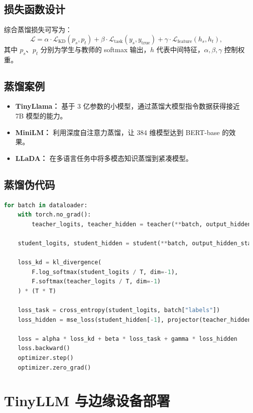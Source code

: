 \documentclass[UTF8,zihao=-4]{ctexart}
\begin{document}
\subsection{损失函数设计}
综合蒸馏损失可写为：
\begin{equation}
\mathcal{L} = \alpha \cdot \mathcal{L}_{\text{KD}}(p_s, p_t) + \beta \cdot \mathcal{L}_{\text{task}}(y_s, y_{\text{true}}) + \gamma \cdot \mathcal{L}_{\text{feature}}(h_s, h_t),
\end{equation}
其中 $p_s$、$p_t$ 分别为学生与教师的 softmax 输出，$h$ 代表中间特征，$\alpha,\beta,\gamma$ 控制权重。

\subsection{蒸馏案例}
\begin{itemize}
  \item \textbf{TinyLlama：} 基于 3 亿参数的小模型，通过蒸馏大模型指令数据获得接近 7B 模型的能力。
  \item \textbf{MiniLM：} 利用深度自注意力蒸馏，让 384 维模型达到 BERT-base 的效果。
  \item \textbf{LLaDA：} 在多语言任务中将多模态知识蒸馏到紧凑模型。
\end{itemize}

\subsection{蒸馏伪代码}
\begin{lstlisting}[language=Python,caption={Teacher-Student 蒸馏训练循环简例}]
for batch in dataloader:
    with torch.no_grad():
        teacher_logits, teacher_hidden = teacher(**batch, output_hidden_states=True)

    student_logits, student_hidden = student(**batch, output_hidden_states=True)

    loss_kd = kl_divergence(
        F.log_softmax(student_logits / T, dim=-1),
        F.softmax(teacher_logits / T, dim=-1)
    ) * (T * T)

    loss_task = cross_entropy(student_logits, batch["labels"])
    loss_hidden = mse_loss(student_hidden[-1], projector(teacher_hidden[-1]))

    loss = alpha * loss_kd + beta * loss_task + gamma * loss_hidden
    loss.backward()
    optimizer.step()
    optimizer.zero_grad()
\end{lstlisting}

\section{TinyLLM 与边缘设备部署}
\end{document}
